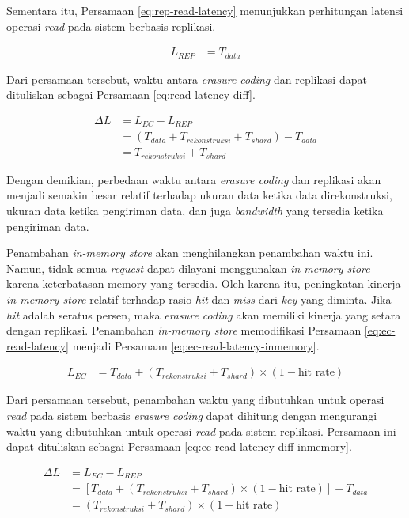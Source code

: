 \begin{enumerate}
  Sementara itu, Persamaan \ref{eq:rep-read-latency} menunjukkan perhitungan latensi operasi \textit{read} pada sistem berbasis replikasi.

  \begin{align}
  L_{REP} &= T_{data}
  \label{eq:rep-read-latency}
  \end{align}

  Dari persamaan tersebut, waktu antara \textit{erasure coding} dan replikasi dapat dituliskan sebagai Persamaan \ref{eq:read-latency-diff}.

  \begin{align}
  \Delta L &= L_{EC} - L_{REP} \\
  &= (T_{data} + T_{rekonstruksi} + T_{shard}) - T_{data} \\
  &= T_{rekonstruksi} + T_{shard}
  \label{eq:read-latency-diff}
  \end{align}

  Dengan demikian, perbedaan waktu antara \textit{erasure coding} dan replikasi akan menjadi semakin besar relatif terhadap ukuran data ketika data direkonstruksi, ukuran data ketika pengiriman data, dan juga \textit{bandwidth} yang tersedia ketika pengiriman data.
  
  Penambahan \textit{in-memory store} akan menghilangkan penambahan waktu ini. Namun, tidak semua \textit{request} dapat dilayani menggunakan \textit{in-memory store} karena keterbatasan memory yang tersedia. Oleh karena itu, peningkatan kinerja \textit{in-memory store} relatif terhadap rasio \textit{hit} dan \textit{miss} dari \textit{key} yang diminta. Jika \textit{hit} adalah seratus persen, maka \textit{erasure coding} akan memiliki kinerja yang setara dengan replikasi. Penambahan \textit{in-memory store} memodifikasi Persamaan \ref{eq:ec-read-latency} menjadi Persamaan \ref{eq:ec-read-latency-inmemory}.

  \begin{align}
    L_{EC} &= T_{data} + (T_{rekonstruksi} + T_{shard}) \times (1 - \text{hit rate})
    \label{eq:ec-read-latency-inmemory}
  \end{align}

  Dari persamaan tersebut, penambahan waktu yang dibutuhkan untuk operasi \textit{read} pada sistem berbasis \textit{erasure coding} dapat dihitung dengan mengurangi waktu yang dibutuhkan untuk operasi \textit{read} pada sistem replikasi. Persamaan ini dapat dituliskan sebagai Persamaan \ref{eq:ec-read-latency-diff-inmemory}.

  \begin{align}
    \Delta L &= L_{EC} - L_{REP} \\
    &= \left[T_{data} + (T_{rekonstruksi} + T_{shard}) \times (1 - \text{hit rate})\right] - T_{data} \\
    &= (T_{rekonstruksi} + T_{shard}) \times (1 - \text{hit rate})
    \label{eq:ec-read-latency-diff-inmemory}
  \end{align}


\end{enumerate}
